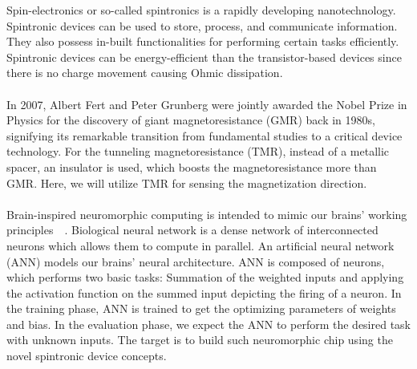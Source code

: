 \documentclass[12pt,a4paper,bold]{thesis}
\theoremstyle{thm}
\theoremstyle{definition}
\begin{document}
Spin-electronics or so-called spintronics is a rapidly developing nanotechnology. Spintronic
devices can be used to store, process, and communicate information. They also possess in-built functionalities for performing certain tasks efficiently. Spintronic devices can be energy-efficient than the transistor-based devices since there is no charge movement causing Ohmic dissipation.~\cite{khr123}\\ 
\\
In 2007, Albert Fert and Peter Grunberg were jointly awarded the Nobel Prize in Physics for the discovery of giant magnetoresistance (GMR) back in 1980s, signifying its remarkable transition from fundamental studies to a critical device technology. For the tunneling magnetoresistance (TMR), instead of a metallic spacer, an insulator is used, which boosts the magnetoresistance more than GMR. Here, we will utilize TMR for sensing the magnetization direction.\\
\\
Brain-inspired neuromorphic computing is intended to mimic our brains' working principles~\cite{yon1958computer}~\cite{poon2011neuromorphic}. Biological neural network is a dense network of interconnected neurons which allows them to compute in parallel. An artificial neural network (ANN) models our brains’ neural architecture. ANN is composed of neurons, which performs two basic tasks: Summation of the weighted inputs and applying the activation function on the summed input depicting the firing of a neuron. In the training phase, ANN is trained to get the optimizing parameters of weights and bias. In the evaluation phase, we expect the ANN to perform the desired task with unknown inputs. The target is to build such neuromorphic chip using the novel spintronic device concepts.~\cite{khr124,khr125}
   
\end{document}
